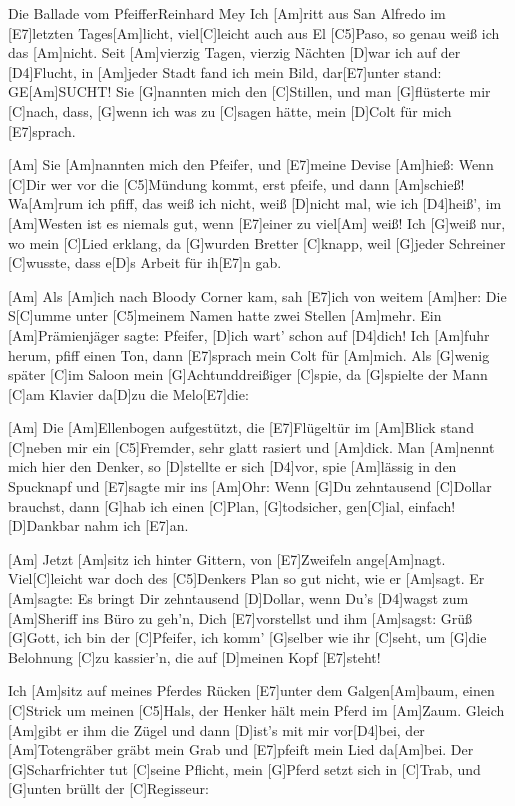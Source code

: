 \documentclass[../main.tex]{subfiles}
\begin{document}
\begin{song}{Die Ballade vom Pfeiffer}{Reinhard Mey}{}
Ich [Am]ritt aus San Alfredo im [E7]letzten Tages[Am]licht,
viel[C]leicht auch aus El [C5]Paso, so genau weiß ich das [Am]nicht.
Seit [Am]vierzig Tagen, vierzig Nächten [D]war ich auf der [D4]Flucht,
in [Am]jeder Stadt fand ich mein Bild, dar[E7]unter stand: GE[Am]SUCHT!
Sie [G]nannten mich den [C]Stillen, und man [G]flüsterte mir [C]nach,
dass, [G]wenn ich was zu [C]sagen hätte, mein [D]Colt für mich [E7]sprach.

[Am] \hh [Em] \hh [Am] \hh [G] \hh [Am] \hh 
Sie [Am]nannten mich den Pfeifer, und [E7]meine Devise [Am]hieß:
Wenn [C]Dir wer vor die [C5]Mündung kommt, erst pfeife, und dann [Am]schieß!
Wa[Am]rum ich pfiff, das weiß ich nicht, weiß [D]nicht mal, wie ich [D4]heiß',
im [Am]Westen ist es niemals gut, wenn [E7]einer zu viel[Am] weiß!
Ich [G]weiß nur, wo mein [C]Lied erklang, da [G]wurden Bretter [C]knapp,
weil [G]jeder Schreiner [C]wusste, dass e[D]s Arbeit für ih[E7]n gab.

[Am] \hh [Em] \hh [Am] \hh [G] \hh [Am] \hh 
Als [Am]ich nach Bloody Corner kam, sah [E7]ich von weitem [Am]her:
Die S[C]umme unter [C5]meinem Namen hatte zwei Stellen [Am]mehr.
Ein [Am]Prämienjäger sagte: Pfeifer, [D]ich wart' schon auf [D4]dich!
Ich [Am]fuhr herum, pfiff einen Ton, dann [E7]sprach mein Colt für [Am]mich.
Als [G]wenig später [C]im Saloon mein [G]Achtunddreißiger [C]spie,
da [G]spielte der Mann [C]am Klavier da[D]zu die Melo[E7]die:

[Am] \hh [Em] \hh [Am] \hh [G] \hh [Am] \hh 
Die [Am]Ellenbogen aufgestützt, die [E7]Flügeltür im [Am]Blick
stand [C]neben mir ein [C5]Fremder, sehr glatt rasiert und [Am]dick.
Man [Am]nennt mich hier den Denker, so [D]stellte er sich [D4]vor,
spie [Am]lässig in den Spucknapf und [E7]sagte mir ins [Am]Ohr:
Wenn [G]Du zehntausend [C]Dollar brauchst, dann [G]hab ich einen [C]Plan,
[G]todsicher, gen[C]ial, einfach! [D]Dankbar nahm ich [E7]an.

[Am] \hh [Em] \hh [Am] \hh [G] \hh [Am] \hh 
Jetzt [Am]sitz ich hinter Gittern, von [E7]Zweifeln ange[Am]nagt.
Viel[C]leicht war doch des [C5]Denkers Plan so gut nicht, wie er [Am]sagt.
Er [Am]sagte: Es bringt Dir zehntausend [D]Dollar, wenn Du's [D4]wagst
zum [Am]Sheriff ins Büro zu geh'n, Dich [E7]vorstellst und ihm [Am]sagst:
Grüß [G]Gott, ich bin der [C]Pfeifer, ich komm' [G]selber wie ihr [C]seht,
um [G]die Belohnung [C]zu kassier'n, die auf [D]meinen Kopf [E7]steht!

\pagebreak
[Am] \hh [Em] \hh [Am] \hh [G] \hh [Am] \hh 
Ich [Am]sitz auf meines Pferdes Rücken [E7]unter dem Galgen[Am]baum,
einen [C]Strick um meinen [C5]Hals, der Henker hält mein Pferd im [Am]Zaum.
Gleich [Am]gibt er ihm die Zügel und dann [D]ist's mit mir vor[D4]bei,
der [Am]Totengräber gräbt mein Grab und [E7]pfeift mein Lied da[Am]bei.
Der [G]Scharfrichter tut [C]seine Pflicht, mein [G]Pferd setzt sich in [C]Trab,
und [G]unten brüllt der [C]Regisseur:

\end{song}
\end{document}
